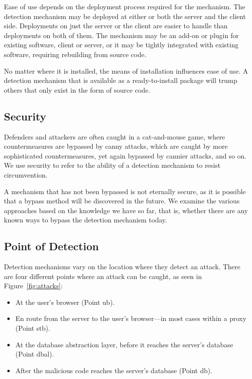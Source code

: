 \documentclass[conference]{IEEEtran}
\begin{document}
Ease of use depends on the deployment process required for the
mechanism. The detection mechanism may be deployed at either or both
the server and the client side. Deployments on just the server or the client are
easier to handle than deployments on both of them. The mechanism may
be an add-on or plugin for existing software, client or server, or it
may be tightly integrated with existing software, requiring rebuilding
from source code.

No matter where it is installed, the means of installation influences
ease of use. A detection mechanism that is available as a ready-to-install
package will trump others that only exist in the form
of source code. 

\subsection{Security}

Defenders and attackers are often caught in a cat-and-mouse game,
where countermeasures are bypassed by canny attacks, which are caught
by more sophisticated countermeasures, yet again bypassed by cannier
attacks, and so on. We use security to refer to the ability of a
detection mechanism to resist circumvention. 

A mechanism that has not been bypassed is not eternally secure, as it
is possible that a bypass method will be discovered in the future. We
examine the various approaches based on the knowledge we have so far,
that is, whether there are any known ways to bypass the detection
mechanism today.

\subsection{Point of Detection}

Detection mechanisms vary on the location where they detect an attack.
There are four different points where an attack can be caught, as seen
in Figure~\ref{fig:attacks}:
\begin{itemize}
\item At the user's browser (Point {\sc ub}).
\item En route from the server to the user's browser---in most cases
within a proxy (Point {\sc s}t{\sc b}).
\item At the database abstraction layer, before it reaches the server's database
  (Point {\sc dbal}).
\item After the malicious code reaches the server's database
  (Point {\sc db}).
\end{itemize}
\end{document}
